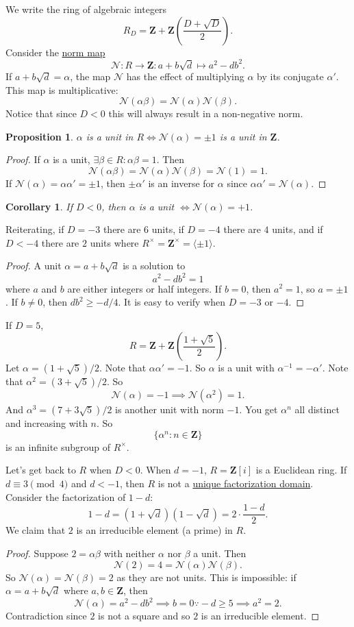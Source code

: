 \documentclass[11pt, oneside]{amsart}
\numberwithin{equation}{section}
\numberwithin{theorem}{section}
\newtheorem{corollary}[theorem]{Corollary}
\newtheorem{proposition}[theorem]{Proposition}
\theoremstyle{definition}
\def\Z{\mathbf{Z}}
\def\N{\mathcal{N}}
\begin{document}
{We write the ring of algebraic integers 
$$
R_D = \Z+\Z\left(\frac{D+\sqrt D}{2}\right).
$$
Consider the \underline{norm map}
$$
\N : R\to\Z : a+b\sqrt d\mapsto a^2-db^2.
$$
If $a+b\sqrt d=\alpha$, the map $\N$ has the effect of multiplying $\alpha$ by its conjugate $\alpha'$. This map is multiplicative:
$$
\N(\alpha\beta) = \N(\alpha)\N(\beta).
$$
Notice that since $D<0$ this will always result in a non-negative norm. 
\begin{proposition}
$\alpha$ is a unit in $R\iff\N(\alpha) = \pm 1$ is a unit in $\Z$.
\end{proposition}
\begin{proof}
If $\alpha$ is a unit, $\exists\beta\in R : \alpha\beta =1$. Then 
$$
\N(\alpha\beta) = \N(\alpha)\N(\beta) = \N(1) = 1.
$$
If $\N(\alpha) =\alpha\alpha' = \pm 1$, then $\pm\alpha'$ is an inverse for $\alpha$ since $\alpha\alpha' = \N(\alpha)$.
\end{proof}
\begin{corollary}
If $D<0$, then $\alpha $ is a unit $\iff \N(\alpha) = +1$.
\end{corollary}
Reiterating, if $D  = -3$ there are $6$ units, if $D  = -4$ there are $4$ units, and if $D  < -4$ there are $2$ units where $R^\times =\Z^\times = \langle \pm 1\rangle$.
\begin{proof}
A unit $\alpha=a+b\sqrt d$ is a solution to 
$$
a^2 - db^2 = 1
$$
where $a$ and $b$ are either integers or half integers. If $b=0$, then $a^2= 1$, so $a=\pm 1$. If $b\neq 0$, then $db^2\geqslant -d/4$. It is easy to verify when $D=-3$ or $-4$.
\end{proof}

If $D=5$, 
$$
R= \Z+\Z\left(\frac{1+\sqrt 5}{2}\right).
$$
Let $\alpha = (1+\sqrt 5)/2$. Note that $\alpha\alpha ' = -1$.  So $\alpha$ is a unit with $\alpha^{-1}=-\alpha'$. Note that $\alpha^2=(3+\sqrt 5)/2$. So
$$
\N (\alpha) = -1\implies \N(\alpha^2)= 1.
$$
And $\alpha^3=(7+3\sqrt 5)/2$ is another unit with norm $-1$. You get $\alpha^n$ all distinct and increasing with $n$. So 
$$
\{\alpha^n : n\in\Z\}
$$
is an infinite subgroup of $R^\times$.

Let's get back to $R$ when $D<0$. When $d=-1$, $R = \Z[i]$ is a Euclidean ring. If $d\equiv 3\pmod 4$ and $d<-1$, then $R$ is not a \underline{unique factorization domain}. Consider the factorization of $1-d$:
$$
1-d = (1+\sqrt d)(1-\sqrt d) =2\cdot \frac{1-d}{2}.
$$
We claim that $2$ is an irreducible element (a prime) in $R$.
\begin{proof}
Suppose $2=\alpha\beta$ with neither $\alpha$ nor $\beta$ a unit. Then 
$$
\N(2) = 4= \N(\alpha)\N(\beta).
$$
So $\N(\alpha)=\N(\beta) = 2$ as they are not units. This is impossible: if $\alpha = a+b\sqrt d$ where $a,b\in\Z$, then 
$$
\N(\alpha) = a^2 - db^2\implies b=0 \because -d\geqslant 5 \implies a^2 = 2.
$$
Contradiction since $2$ is not a square and so $2$ is an irreducible element.
\end{proof}

}
\end{document}
